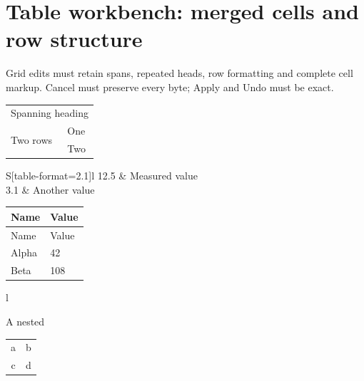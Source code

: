 \documentclass{article}
\begin{document}
\section*{Table workbench: merged cells and row structure}
Grid edits must retain spans, repeated heads, row formatting and complete
cell markup. Cancel must preserve every byte; Apply and Undo must be exact.

\begin{tabular}{ll}
\multicolumn{2}{c}{Spanning heading} \\
\multirow{2}{*}{Two rows} & One \\
 & Two \\
\end{tabular}

\begin{tabular}{S[table-format=2.1]l}
12.5 & Measured value \\
3.1 & Another value \\
\end{tabular}

\begin{longtable}{ll}
\toprule
Name & Value \\
\endfirsthead
Name & Value \\
\endhead
\bottomrule
\endfoot
Alpha & 42 \\
Beta & 108 \\
\end{longtable}

\begin{tabular}{l}
{A nested \begin{tabular}{cc}a & b \\ c & d\end{tabular}} \\
\end{tabular}
\end{document}
